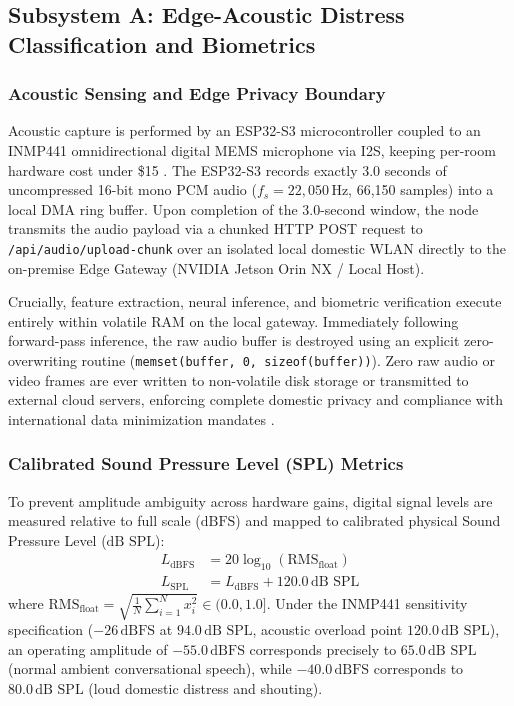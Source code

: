\documentclass[conference]{IEEEtran}
\begin{document}
\subsection{Subsystem A: Edge-Acoustic Distress Classification and Biometrics}
\subsubsection{Acoustic Sensing and Edge Privacy Boundary}
Acoustic capture is performed by an ESP32-S3 microcontroller coupled to an INMP441 omnidirectional digital MEMS microphone via I2S, keeping per-room hardware cost under \$15 \cite{b5}. The ESP32-S3 records exactly 3.0 seconds of uncompressed 16-bit mono PCM audio ($f_s = 22,050$\,Hz, 66,150 samples) into a local DMA ring buffer. Upon completion of the 3.0-second window, the node transmits the audio payload via a chunked HTTP POST request to \texttt{/api/audio/upload-chunk} over an isolated local domestic WLAN directly to the on-premise Edge Gateway (NVIDIA Jetson Orin NX / Local Host). 

Crucially, feature extraction, neural inference, and biometric verification execute entirely within volatile RAM on the local gateway. Immediately following forward-pass inference, the raw audio buffer is destroyed using an explicit zero-overwriting routine (\texttt{memset(buffer, 0, sizeof(buffer))}). Zero raw audio or video frames are ever written to non-volatile disk storage or transmitted to external cloud servers, enforcing complete domestic privacy and compliance with international data minimization mandates \cite{b1}.

\subsubsection{Calibrated Sound Pressure Level (SPL) Metrics}
To prevent amplitude ambiguity across hardware gains, digital signal levels are measured relative to full scale ($\text{dBFS}$) and mapped to calibrated physical Sound Pressure Level ($\text{dB SPL}$):
\begin{align}
L_{\text{dBFS}} &= 20 \log_{10}(\text{RMS}_{\text{float}}) \label{eq_dbfs} \\
L_{\text{SPL}} &= L_{\text{dBFS}} + 120.0\,\text{dB SPL} \label{eq_spl}
\end{align}
where $\text{RMS}_{\text{float}} = \sqrt{\frac{1}{N}\sum_{i=1}^{N} x_i^2} \in (0.0, 1.0]$. Under the INMP441 sensitivity specification ($-26\,\text{dBFS}$ at $94.0\,\text{dB SPL}$, acoustic overload point $120.0\,\text{dB SPL}$), an operating amplitude of $-55.0\,\text{dBFS}$ corresponds precisely to $65.0\,\text{dB SPL}$ (normal ambient conversational speech), while $-40.0\,\text{dBFS}$ corresponds to $80.0\,\text{dB SPL}$ (loud domestic distress and shouting).
\end{document}
